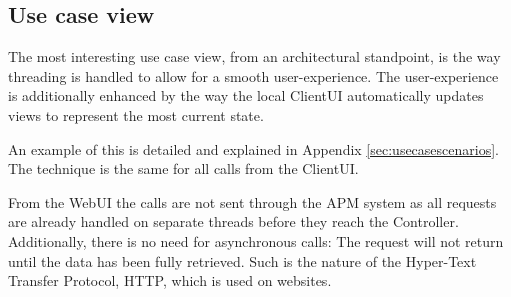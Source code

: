 \subsection{Use case view}

The most interesting use case view, from an architectural standpoint, is the way threading is handled
to allow for a smooth user-experience. The user-experience is additionally enhanced by the way the
local ClientUI automatically updates views to represent the most current state.

An example of this is detailed and explained in Appendix \ref{sec:usecasescenarios}. The technique
is the same for all calls from the ClientUI.

From the WebUI the calls are not sent through the APM system as all requests are already handled on
separate threads before they reach the Controller. Additionally, there is no need for asynchronous calls:
The request will not return until the data has been fully retrieved. Such is the nature of the Hyper-Text
Transfer Protocol, HTTP, which is used on websites.